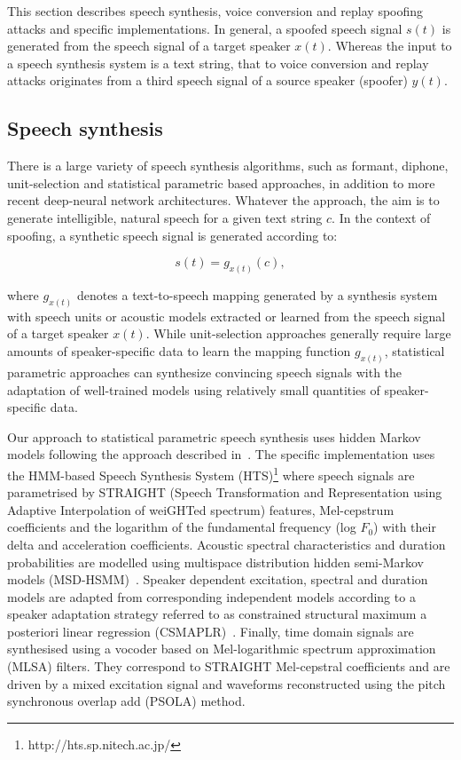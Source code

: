 This section describes speech synthesis, voice conversion and replay spoofing attacks and specific implementations.  In general, a spoofed speech signal $s(t)$ is generated from the speech signal of a target speaker $x(t)$.  Whereas the input to a speech synthesis system is a text string, that to voice conversion and replay attacks originates from a third speech signal of a source speaker (spoofer) $y(t)$.  



\subsection{Speech synthesis}
\label{ssec:spsyn}

There is a large variety of speech synthesis algorithms, such as formant, diphone, unit-selection and statistical parametric based approaches, in addition to more recent deep-neural network architectures.  Whatever the approach, the aim is to generate intelligible, natural speech for a given text string $c$. In the context of spoofing, a synthetic speech signal is generated according to:

\begin{equation}
s(t) = g_{x(t)}(c),
\label{eq:tts}
\end{equation}

\noindent where $g_{x(t)}$ denotes a text-to-speech mapping generated by a synthesis system with speech units or acoustic models extracted or learned from the speech signal of a target speaker $x(t)$.  While unit-selection approaches generally require large amounts of speaker-specific data to learn the mapping function $g_{x(t)}$, statistical parametric approaches can synthesize convincing speech signals with the adaptation of well-trained models using relatively small quantities of speaker-specific data.  

Our approach to statistical parametric speech synthesis uses hidden Markov models following the approach described in~\cite{Yamagishi2009}.  The specific implementation uses the HMM-based Speech Synthesis System (HTS)\footnote{http://hts.sp.nitech.ac.jp/} where speech signals are parametrised by STRAIGHT (Speech Transformation and Representation using Adaptive Interpolation of weiGHTed spectrum) features, Mel-cepstrum coefficients and the logarithm of the fundamental frequency (log $F_{0}$) with their delta and acceleration coefficients. Acoustic spectral characteristics and duration probabilities are modelled using multispace distribution hidden semi-Markov models (MSD-HSMM)~\cite{Russell1985}.  Speaker dependent  excitation, spectral and duration models are adapted from corresponding independent models according to a speaker adaptation strategy referred to as constrained structural maximum a posteriori linear regression (CSMAPLR)~\cite{Yamagishi2009a}.  Finally, time domain signals are synthesised using a vocoder based on Mel-logarithmic spectrum approximation (MLSA) filters.  They correspond to STRAIGHT Mel-cepstral coefficients and are driven by a mixed excitation signal and waveforms reconstructed using the pitch synchronous overlap add (PSOLA) method.




